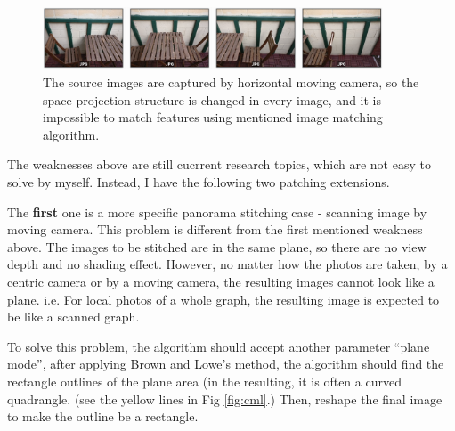 \documentclass[10pt,twocolumn,letterpaper]{article}
\begin{document}
\begin{figure}
    \begin{center}
        \includegraphics[width=0.9\textwidth]{horizontal_motion}
    \end{center}
    \caption{The source images are captured by horizontal moving camera, so the space projection structure is changed in every image,
    and it is impossible to match features using mentioned image matching algorithm.}
    \label{fig:cameramotion}
\end{figure}

The weaknesses above are still cucrrent research topics, which are not easy to solve by myself. Instead, I have the following two patching extensions.

The \textbf{first} one is a more specific panorama stitching case - scanning image by moving camera.
This problem is different from the first mentioned weakness above.
The images to be stitched are in the same plane, so there are no view depth and no shading effect.
However, no matter how the photos are taken, by a centric camera or by a moving camera, the resulting images cannot look like a plane.
i.e. For local photos of a whole graph, the resulting image is expected to be like a scanned graph.

To solve this problem, the algorithm should accept another parameter ``plane mode'',
after applying Brown and Lowe's method, the algorithm should find the rectangle outlines of the plane area
(in the resulting, it is often a curved quadrangle. (see the yellow lines in Fig \ref{fig:cml}.)
Then, reshape the final image to make the outline be a rectangle.
\end{document}
